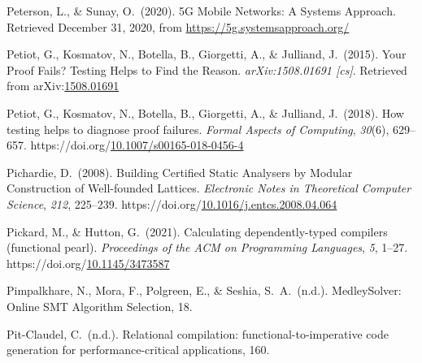 \documentclass[12pt,twoside]{article}
\begin{document}
{\begin{thebibliography}{1079}
\mdbibitemlabel{}Peterson, L., \& Sunay, O.~(2020). 5G Mobile Networks: A Systems Approach. Retrieved December 31, 2020, from \href{https://5g.systemsapproach.org/}{{\ttfamily https://\hspace{0pt}5g.\hspace{0pt}systemsapproach.\hspace{0pt}org/\hspace{0pt}}}%

\mdbibitemlabel{}Petiot, G., Kosmatov, N., Botella, B., Giorgetti, A., \& Julliand, J.~(2015). Your Proof Fails? Testing Helps to Find the Reason. \emph{arXiv:1508.01691 {}[cs]}. Retrieved from arXiv:\href{http://arxiv.org/abs/1508.01691}{1508.01691}%

\mdbibitemlabel{}Petiot, G., Kosmatov, N., Botella, B., Giorgetti, A., \& Julliand, J.~(2018). How testing helps to diagnose proof failures. \emph{Formal Aspects of Computing}, \emph{30}(6), 629–657. https://doi.org/\href{https://dx.doi.org/10.1007/s00165-018-0456-4}{10.1007/s00165-018-0456-4}%

\mdbibitemlabel{}Pichardie, D.~(2008). Building Certified Static Analysers by Modular Construction of Well-founded Lattices. \emph{Electronic Notes in Theoretical Computer Science}, \emph{212}, 225–239. https://doi.org/\href{https://dx.doi.org/10.1016/j.entcs.2008.04.064}{10.1016/j.entcs.2008.04.064}%

\mdbibitemlabel{}Pickard, M., \& Hutton, G.~(2021). Calculating dependently-typed compilers (functional pearl). \emph{Proceedings of the ACM on Programming Languages}, \emph{5}, 1–27. https://doi.org/\href{https://dx.doi.org/10.1145/3473587}{10.1145/3473587}%

\mdbibitemlabel{}Pimpalkhare, N., Mora, F., Polgreen, E., \& Seshia, S.~A.~(n.d.). MedleySolver: Online SMT Algorithm Selection, 18.%

\mdbibitemlabel{}Pit-Claudel, C.~(n.d.). Relational compilation: functional-to-imperative code generation for performance-critical applications, 160.%


\end{thebibliography}}
\end{document}
